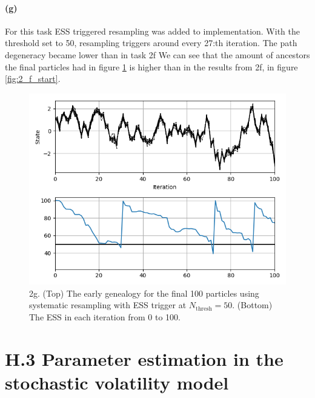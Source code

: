 \documentclass{article}
\begin{document}
\paragraph{(g)}
For this task ESS triggered resampling was added to implementation.
With the threshold set to 50, resampling triggers around every 27:th iteration.
The path degeneracy became lower than in task 2f We can see that the amount of ancestors the final particles had in figure \ref{fig:2_g} is higher than in the results from 2f, in figure \ref{fig:2_f_start}.

\begin{figure}[h]
	\centering
	\includegraphics[width=.7\linewidth]{2_g}
	\caption{2g. (Top) The early genealogy for the final 100 particles using systematic resampling with ESS trigger at $ N_{\text{thresh}} = 50 $. (Bottom) The ESS in each iteration from 0 to 100.}
	\label{fig:2_g}
\end{figure}

\cleardoublepage
\section*{H.3 Parameter estimation in the stochastic volatility model}
\end{document}
